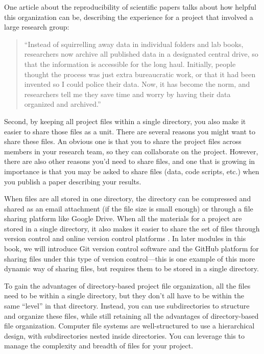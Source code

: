 \documentclass[]{tufte-book}
\begin{document}
One article about the reproducibility of scientific papers talks about how helpful
this organization can be, describing the experience for a project that involved
a large research group:

\begin{quote}
``Instead of squirrelling away data in individual folders and lab books,
researchers now archive all published data in a designated central drive, so
that the information is accessible for the long haul. Initially, people thought
the process was just extra bureaucratic work, or that it had been invented so I
could police their data. Now, it has become the norm, and researchers tell me
they save time and worry by having their data organized and archived.''
\citep{winchester2018give}
\end{quote}

Second, by keeping all project files within a single directory, you also make it
easier to share those files as a unit. There are several reasons you might
want to share these files. An obvious one is that you to share
the project files across members in your research team, so they can collaborate
on the project. However, there are also other reasons you'd need to
share files, and one that is growing in importance is that you may be asked to
share files (data, code scripts, etc.) when you publish a paper describing your
results.

When files are all stored in one directory, the directory can be compressed and
shared as an email attachment (if the file size is small enough) or through a
file sharing platform like Google Drive. When all the materials for a project
are stored in a single directory, it also makes it easier to share the set of
files through version control and online version control platforms
\citep{vuorre2021sharing}. In later modules in this book, we will introduce
Git version control software and the GitHub platform for sharing files under
this type of version control---this is one example of this more dynamic way of
sharing files, but requires them to be stored in a single directory.

To gain the advantages of directory-based project file organization, all the
files need to be within a single directory, but they don't all have to be within
the same ``level'' in that directory. Instead, you can use subdirectories to
structure and organize these files, while still retaining all the advantages of
directory-based file organization. Computer file systems are well-structured to
use a hierarchical design, with subdirectories nested inside directories. You
can leverage this to manage the complexity and breadth of files for your
project.
\end{document}
